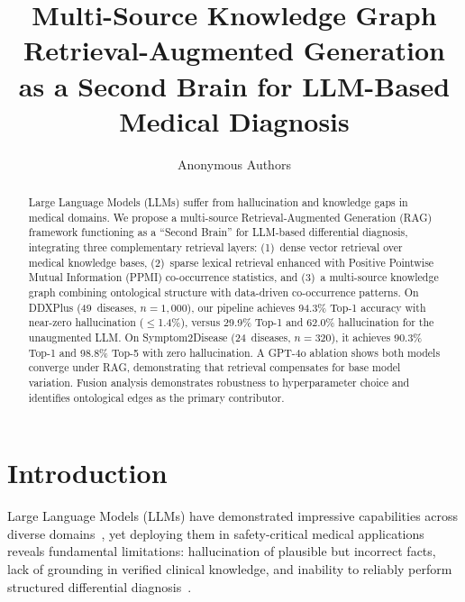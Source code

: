\documentclass[runningheads]{llncs}
\begin{document}
\title{Multi-Source Knowledge Graph Retrieval-Augmented Generation as a Second Brain for LLM-Based Medical Diagnosis}


\author{Anonymous Authors}

\maketitle

\begin{abstract}
Large Language Models (LLMs) suffer from hallucination and knowledge gaps in medical domains. We propose a multi-source Retrieval-Augmented Generation (RAG) framework functioning as a ``Second Brain'' for LLM-based differential diagnosis, integrating three complementary retrieval layers: (1)~dense vector retrieval over medical knowledge bases, (2)~sparse lexical retrieval enhanced with Positive Pointwise Mutual Information (PPMI) co-occurrence statistics, and (3)~a multi-source knowledge graph combining ontological structure with data-driven co-occurrence patterns. On DDXPlus (49~diseases, $n{=}1{,}000$), our pipeline achieves 94.3\% Top-1 accuracy with near-zero hallucination ($\leq$1.4\%), versus 29.9\% Top-1 and 62.0\% hallucination for the unaugmented LLM. On Symptom2Disease (24~diseases, $n{=}320$), it achieves 90.3\% Top-1 and 98.8\% Top-5 with zero hallucination. A GPT-4o ablation shows both models converge under RAG, demonstrating that retrieval compensates for base model variation. Fusion analysis demonstrates robustness to hyperparameter choice and identifies ontological edges as the primary contributor.

\end{abstract}

\section{Introduction}
\label{sec:introduction}

Large Language Models (LLMs) have demonstrated impressive capabilities across diverse domains~\cite{brown2020language,openai2023gpt4}, yet deploying them in safety-critical medical applications reveals fundamental limitations: hallucination of plausible but incorrect facts, lack of grounding in verified clinical knowledge, and inability to reliably perform structured differential diagnosis~\cite{ji2023survey,singhal2023large}.
\end{document}
